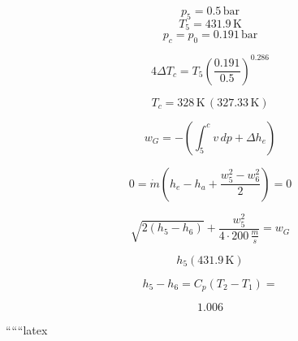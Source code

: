 \[
p_5 = 0.5 \, \text{bar}
\]
\[
T_5 = 431.9 \, \text{K}
\]
\[
p_c = p_0 = 0.191 \, \text{bar}
\]

\[
4 \Delta T_c = T_5 \left( \frac{0.191}{0.5} \right)^{0.286}
\]

\[
T_c = 328 \, \text{K} \, (327.33 \, \text{K})
\]

\[
w_G = - \left( \int_{5}^{c} v \, dp + \Delta h_e \right)
\]

 \quad \Rightarrow \quad {}

\[
0 = \dot{m} \left( h_e - h_a + \frac{w_5^2 - w_6^2}{2} \right) = 0
\]

\[
\sqrt{2 (h_5 - h_6)} + \frac{w_5^2}{4 \cdot 200 \, \frac{m}{s}} = w_G
\]

\[
h_5 (431.9 \, \text{K})
\]

\[
h_5 - h_6 = C_p (T_2 - T_1) =
\]

\[
1.006
\]

``````latex